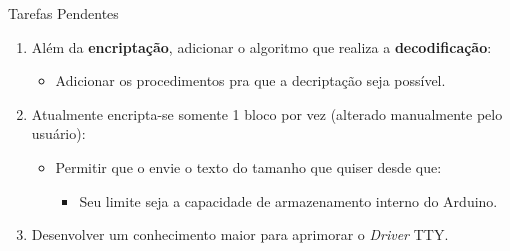 	\begin{frame}{Tarefas Pendentes}
		\begin{enumerate}
			\item Além da \textbf{encriptação}, adicionar o algoritmo que realiza a \textbf{decodificação}:
			\begin{itemize}
				\item Adicionar os procedimentos pra que a decriptação seja possível.
			\end{itemize}
			\item Atualmente encripta-se somente 1 bloco por vez (alterado manualmente pelo usuário):
			\begin{itemize}
				\item Permitir que o envie o texto do tamanho que quiser desde que:
				\begin{itemize}
					\item Seu limite seja a capacidade de armazenamento interno do Arduino.
				\end{itemize}
			\end{itemize}
			\item Desenvolver um conhecimento maior para aprimorar o \textit{Driver} TTY.

		\end{enumerate}
	\end{frame}